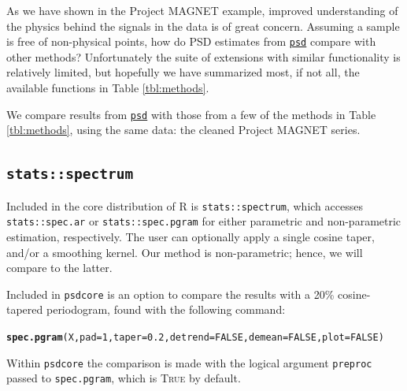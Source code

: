 \documentclass[10pt]{article}\usepackage[]{graphicx}\usepackage[]{color}
\makeatletter
\newcommand{\hlnum}[1]{\textcolor[rgb]{0.686,0.059,0.569}{#1}}%
\newcommand{\hlstd}[1]{\textcolor[rgb]{0.345,0.345,0.345}{#1}}%
\newcommand{\hlkwc}[1]{\textcolor[rgb]{0.333,0.667,0.333}{#1}}%
\newcommand{\hlkwd}[1]{\textcolor[rgb]{0.737,0.353,0.396}{\textbf{#1}}}%
\newenvironment{kframe}{%
 \def\at@end@of@kframe{}%
 \ifinner\ifhmode%
  \def\at@end@of@kframe{\end{minipage}}%
  \begin{minipage}{\columnwidth}%
 \fi\fi%
 \def\FrameCommand##1{\hskip\@totalleftmargin \hskip-\fboxsep
 \colorbox{shadecolor}{##1}\hskip-\fboxsep
     \hskip-\linewidth \hskip-\@totalleftmargin \hskip\columnwidth}%
 \MakeFramed {\advance\hsize-\width
   \@totalleftmargin\z@ \linewidth\hsize
   \@setminipage}}%
 {\par\unskip\endMakeFramed%
 \at@end@of@kframe}
\newenvironment{knitrout}{}{} %
\newcommand{\SC}[1]{\textsc{#1}}
\newcommand{\Rcmd}[1]{\texttt{#1}}
\newcommand{\psd}[0]{\href{http://www.github.com/abarbour/psd/}{\color{blue}\Rcmd{psd}}}
\makeatother
\begin{document}
As we have shown in the Project MAGNET example, 
improved understanding of the physics behind the signals in the data
is of great concern.
Assuming a sample is free of non-physical points, how do
PSD estimates from \psd{}
compare with other methods?
Unfortunately the suite of extensions with similar functionality
is relatively limited, but hopefully we have
summarized most, if not all, the available functions in Table \ref{tbl:methods}.



We compare results from
\psd{} with those from a few of the methods in Table \ref{tbl:methods},
using the same data: the cleaned Project MAGNET series.

\subsection{\Rcmd{stats::spectrum}}

Included in the core distribution of R is \Rcmd{stats::spectrum}, which
accesses \Rcmd{stats::spec.ar} or \Rcmd{stats::spec.pgram} for either
parametric and non-parametric estimation, respectively.  
The user can optionally apply a single cosine taper, and/or a smoothing kernel.
Our method is non-parametric; hence, we will compare to the latter.

Included in \Rcmd{psdcore} is an option to compare the 
results with a 20\% cosine-tapered periodogram,
found with the following command:
\begin{knitrout}
\color{fgcolor}\begin{kframe}
\begin{alltt}
\hlkwd{spec.pgram}\hlstd{(X,} \hlkwc{pad}\hlstd{=}\hlnum{1}\hlstd{,} \hlkwc{taper}\hlstd{=}\hlnum{0.2}\hlstd{,} \hlkwc{detrend}\hlstd{=}\hlnum{FALSE}\hlstd{,} \hlkwc{demean}\hlstd{=}\hlnum{FALSE}\hlstd{,} \hlkwc{plot}\hlstd{=}\hlnum{FALSE}\hlstd{)}
\end{alltt}
\end{kframe}
\end{knitrout}
Within \Rcmd{psdcore} the comparison is
made with
the logical argument \Rcmd{preproc} 
passed to \Rcmd{spec.pgram}, which is \SC{True} by default.
\end{document}
